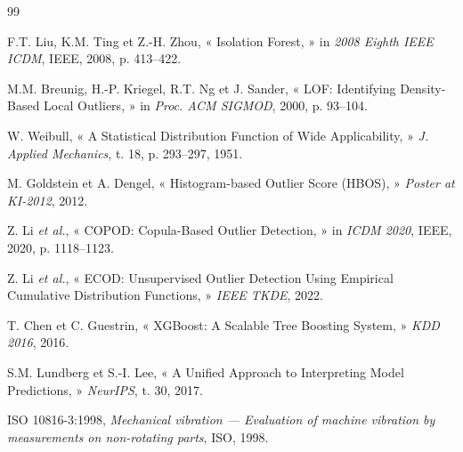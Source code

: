 \documentclass[12pt,a4paper]{report}
\begin{document}
\begin{thebibliography}{99}

 F.T. Liu, K.M. Ting et Z.-H. Zhou, « Isolation Forest, » in \textit{2008 Eighth IEEE ICDM}, IEEE, 2008, p. 413--422.

 M.M. Breunig, H.-P. Kriegel, R.T. Ng et J. Sander, « LOF: Identifying Density-Based Local Outliers, » in \textit{Proc. ACM SIGMOD}, 2000, p. 93--104.

 W. Weibull, « A Statistical Distribution Function of Wide Applicability, » \textit{J. Applied Mechanics}, t. 18, p. 293--297, 1951.

 M. Goldstein et A. Dengel, « Histogram-based Outlier Score (HBOS), » \textit{Poster at KI-2012}, 2012.

 Z. Li \textit{et al.}, « COPOD: Copula-Based Outlier Detection, » in \textit{ICDM 2020}, IEEE, 2020, p. 1118--1123.

 Z. Li \textit{et al.}, « ECOD: Unsupervised Outlier Detection Using Empirical Cumulative Distribution Functions, » \textit{IEEE TKDE}, 2022.

 T. Chen et C. Guestrin, « XGBoost: A Scalable Tree Boosting System, » \textit{KDD 2016}, 2016.

 S.M. Lundberg et S.-I. Lee, « A Unified Approach to Interpreting Model Predictions, » \textit{NeurIPS}, t. 30, 2017.

 ISO 10816-3:1998, \textit{Mechanical vibration — Evaluation of machine vibration by measurements on non-rotating parts}, ISO, 1998.

\end{thebibliography}

\end{document}
